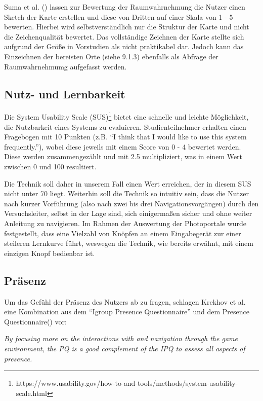Suma et al. (\cite{Suma2010EvaluationEnvironments}) lassen zur Bewertung der Raumwahrnehmung die Nutzer einen Sketch der Karte erstellen und diese von Dritten auf einer Skala von 1 - 5 bewerten. Hierbei wird selbstverständlich nur die Struktur der Karte und nicht die Zeichenqualität bewertet.
Das vollständige Zeichnen der Karte stellte sich aufgrund der Größe in Vorstudien als nicht praktikabel dar. Jedoch kann das Einzeichnen der bereisten Orte (siehe 9.1.3) ebenfalls als Abfrage der Raumwahrnehmumg
aufgefasst werden.

\subsection{Nutz- und Lernbarkeit}
Die System Usability Scale (SUS)\footnote{https://www.usability.gov/how-to-and-tools/methods/system-usability-scale.html}
bietet eine schnelle und leichte Möglichkeit, die Nutzbarkeit eines Systems zu evaluieren. Studienteilnehmer erhalten einen Fragebogen mit 10 Punkten (z.B. “I think that I would like to use this system frequently.”), wobei diese jeweils mit einem Score von 0 - 4 bewertet werden. Diese werden zusammengezählt und mit 2.5 multipliziert, was in einem Wert zwischen 0 und 100 resultiert.

Die Technik soll daher in unserem Fall einen Wert erreichen, der in diesem SUS nicht unter 70 liegt. Weiterhin soll die Technik so intuitiv sein, dass die Nutzer nach kurzer Vorführung (also nach zwei bis drei Navigationsvorgängen) durch den Versuchsleiter, selbst in der Lage sind, sich einigermaßen sicher und ohne weiter Anleitung zu navigieren. Im Rahmen der Auswertung der Photoportale \cite{Kunert2014Photoportals} wurde festgestellt, dass eine Vielzahl von Knöpfen an einem Eingabegerät zur einer steileren Lernkurve führt, weswegen die Technik, wie bereits erwähnt, mit einem einzigen Knopf bedienbar ist.


\subsection{Präsenz}
Um das Gefühl der Präsenz des Nutzers ab zu fragen, schlagen Krekhov et al. \cite{Krekhov2018GulliVR} eine Kombination aus dem “Igroup Presence Questionnaire” \cite{witmer1998measuring} und dem Presence Questionnaire(\cite{schubert1999}) vor:

\begin{addmargin}[25pt]{0pt} 

\textit{By focusing more on the interactions with and navigation
through the game environment, the PQ is a good complement
of the IPQ to assess all aspects of presence.
}\cite{Krekhov2018GulliVR}

\end{addmargin}

